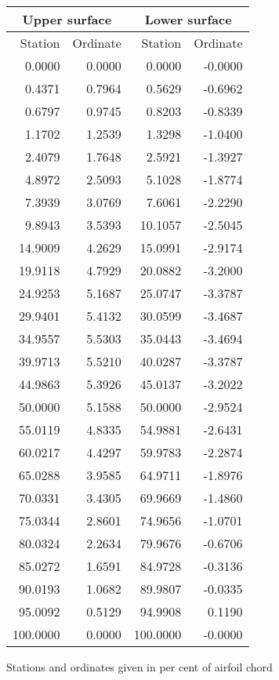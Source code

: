 \documentclass[11pt]{book}
\begin{document}
 \hspace{4mm}
 \begin{tabular}{|r|r|r|r|} \hline 
 \multicolumn{2}{|c|}{Upper surface} & \multicolumn{2}{|c|}{Lower surface} \\
 \hline
 Station & Ordinate & Station & Ordinate \\
 \hline
0.0000 & 0.0000 & 0.0000 & -0.0000 \\
0.4371 & 0.7964 & 0.5629 & -0.6962 \\
0.6797 & 0.9745 & 0.8203 & -0.8339 \\
1.1702 & 1.2539 & 1.3298 & -1.0400 \\
2.4079 & 1.7648 & 2.5921 & -1.3927 \\
4.8972 & 2.5093 & 5.1028 & -1.8774 \\
7.3939 & 3.0769 & 7.6061 & -2.2290 \\
9.8943 & 3.5393 & 10.1057 & -2.5045 \\
14.9009 & 4.2629 & 15.0991 & -2.9174 \\
19.9118 & 4.7929 & 20.0882 & -3.2000 \\
24.9253 & 5.1687 & 25.0747 & -3.3787 \\
29.9401 & 5.4132 & 30.0599 & -3.4687 \\
34.9557 & 5.5303 & 35.0443 & -3.4694 \\
39.9713 & 5.5210 & 40.0287 & -3.3787 \\
44.9863 & 5.3926 & 45.0137 & -3.2022 \\
50.0000 & 5.1588 & 50.0000 & -2.9524 \\
55.0119 & 4.8335 & 54.9881 & -2.6431 \\
60.0217 & 4.4297 & 59.9783 & -2.2874 \\
65.0288 & 3.9585 & 64.9711 & -1.8976 \\
70.0331 & 3.4305 & 69.9669 & -1.4860 \\
75.0344 & 2.8601 & 74.9656 & -1.0701 \\
80.0324 & 2.2634 & 79.9676 & -0.6706 \\
85.0272 & 1.6591 & 84.9728 & -0.3136 \\
90.0193 & 1.0682 & 89.9807 & -0.0335 \\
95.0092 & 0.5129 & 94.9908 & 0.1190 \\
100.0000 & 0.0000 & 100.0000 & -0.0000 \\
 \hline 
 \end{tabular}
 \vspace{8mm}

Stations and ordinates given in per cent of airfoil chord
\end{document}
